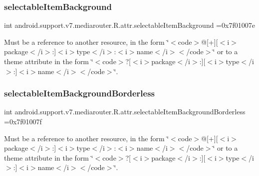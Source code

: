 \subsubsection{\texorpdfstring{selectable\+Item\+Background}{selectableItemBackground}}
{\footnotesize\ttfamily int android.\+support.\+v7.\+mediarouter.\+R.\+attr.\+selectable\+Item\+Background =0x7f01007e\hspace{0.3cm}{\ttfamily [static]}}

Must be a reference to another resource, in the form \char`\"{}$<$code$>$@\mbox{[}+\mbox{]}\mbox{[}$<$i$>$package$<$/i$>$\+:\mbox{]}$<$i$>$type$<$/i$>$\+:$<$i$>$name$<$/i$>$$<$/code$>$\char`\"{} or to a theme attribute in the form \char`\"{}$<$code$>$?\mbox{[}$<$i$>$package$<$/i$>$\+:\mbox{]}\mbox{[}$<$i$>$type$<$/i$>$\+:\mbox{]}$<$i$>$name$<$/i$>$$<$/code$>$\char`\"{}. \mbox{\label{classandroid_1_1support_1_1v7_1_1mediarouter_1_1R_1_1attr_af9f31b51ae90ebbc274d859480b076b7}} 
\subsubsection{\texorpdfstring{selectable\+Item\+Background\+Borderless}{selectableItemBackgroundBorderless}}
{\footnotesize\ttfamily int android.\+support.\+v7.\+mediarouter.\+R.\+attr.\+selectable\+Item\+Background\+Borderless =0x7f01007f\hspace{0.3cm}{\ttfamily [static]}}

Must be a reference to another resource, in the form \char`\"{}$<$code$>$@\mbox{[}+\mbox{]}\mbox{[}$<$i$>$package$<$/i$>$\+:\mbox{]}$<$i$>$type$<$/i$>$\+:$<$i$>$name$<$/i$>$$<$/code$>$\char`\"{} or to a theme attribute in the form \char`\"{}$<$code$>$?\mbox{[}$<$i$>$package$<$/i$>$\+:\mbox{]}\mbox{[}$<$i$>$type$<$/i$>$\+:\mbox{]}$<$i$>$name$<$/i$>$$<$/code$>$\char`\"{}. \mbox{\label{classandroid_1_1support_1_1v7_1_1mediarouter_1_1R_1_1attr_acab72cb74472022e2dbb10ab9c0eb017}} 
